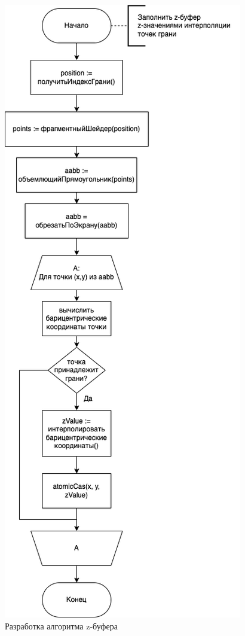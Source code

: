 \begin{figure}[H]
	\begin{center}
		\includegraphics[scale=0.5]{img/diagrams-zfiller.drawio.png}
	\end{center}
	\captionsetup{justification=centering}
	\caption{Разработка алгоритма z-буфера}
	\label{img:z_buffer}
\end{figure}


